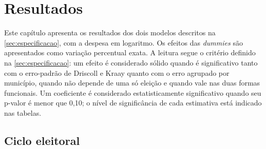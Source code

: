 
\chapter{Resultados}\label{cap:resultados}

Este capítulo apresenta os resultados dos dois modelos descritos na \autoref{sec:especificacao}, com a despesa em logaritmo. Os efeitos das \textit{dummies} são apresentados como variação percentual exata. A leitura segue o critério definido na \autoref{sec:especificacao}: um efeito é considerado sólido quando é significativo tanto com o erro-padrão de Driscoll e Kraay quanto com o erro agrupado por município, quando não depende de uma só eleição e quando vale nas duas formas funcionais. Um coeficiente é considerado estatisticamente significativo quando seu p-valor é menor que 0,10; o nível de significância de cada estimativa está indicado nas tabelas.

\section{Ciclo eleitoral}\label{sec:res_ciclo}

